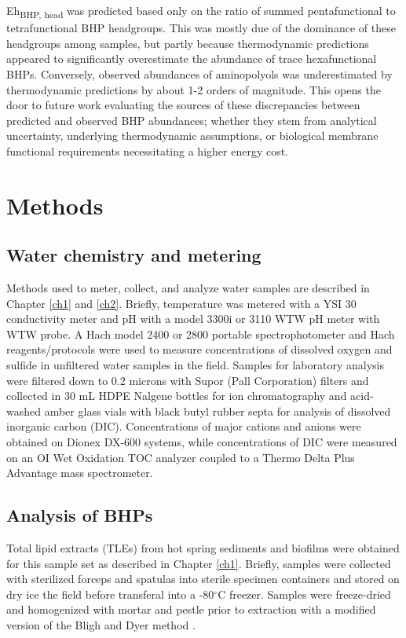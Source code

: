 Eh\textsubscript{BHP, head} was predicted based only on the ratio of summed pentafunctional to tetrafunctional BHP headgroups. This was mostly due of the dominance of these headgroups among samples, but partly because thermodynamic predictions appeared to significantly overestimate the abundance of trace hexafunctional BHPs. Conversely, observed abundances of aminopolyols was underestimated by thermodynamic predictions by about 1-2 orders of magnitude. This opens the door to future work evaluating the sources of these discrepancies between predicted and observed BHP abundances; whether they stem from analytical uncertainty, underlying thermodynamic assumptions, or biological membrane functional requirements necessitating a higher energy cost.




\section{Methods}

\subsection{Water chemistry and metering}
Methods used to meter, collect, and analyze water samples are described in Chapter \ref{ch1} and \ref{ch2}. Briefly, temperature was metered with a YSI 30 conductivity meter and pH with a model 3300i or 3110 WTW pH meter with WTW probe. A Hach model 2400 or 2800 portable spectrophotometer and Hach reagents/protocols were used to measure concentrations of dissolved oxygen and sulfide in unfiltered water samples in the field. Samples for laboratory analysis were filtered down to 0.2 microns with Supor (Pall Corporation) filters and collected in 30 mL HDPE Nalgene bottles for ion chromatography and acid-washed amber glass vials with black butyl rubber septa for analysis of dissolved inorganic carbon (DIC). Concentrations of major cations and anions were obtained on Dionex DX-600 systems, while concentrations of DIC were measured on an OI Wet Oxidation TOC analyzer coupled to a Thermo Delta Plus Advantage mass spectrometer.

\subsection{Analysis of BHPs} Total lipid extracts (TLEs) from hot spring sediments and biofilms were obtained for this sample set as described in Chapter \ref{ch1}. Briefly, samples were collected with sterilized forceps and spatulas into sterile specimen containers and stored on dry ice the field before transferal into a -80$^{\circ}$C freezer. Samples were freeze-dried and homogenized with mortar and pestle prior to extraction with a modified version of the Bligh and Dyer method \citep{white1998signature}.

